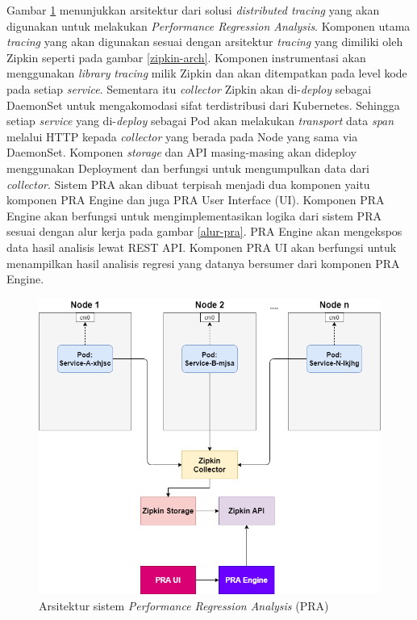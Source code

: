 Gambar \ref{arch-pra} menunjukkan arsitektur dari solusi \textit{distributed tracing} yang akan digunakan untuk melakukan \textit{Performance Regression Analysis}. Komponen utama \textit{tracing} yang akan digunakan sesuai dengan arsitektur \textit{tracing} yang dimiliki oleh Zipkin seperti pada gambar \ref{zipkin-arch}. Komponen instrumentasi akan menggunakan \textit{library} \textit{tracing} milik Zipkin dan akan ditempatkan pada level kode pada setiap \textit{service}. Sementara itu \textit{collector} Zipkin akan di-\textit{deploy} sebagai DaemonSet untuk mengakomodasi sifat terdistribusi dari Kubernetes. Sehingga setiap \textit{service} yang di-\textit{deploy} sebagai Pod akan melakukan \textit{transport} data \textit{span} melalui HTTP kepada \textit{collector} yang berada pada Node yang sama via DaemonSet. Komponen \textit{storage} dan API masing-masing akan dideploy menggunakan Deployment dan berfungsi untuk mengumpulkan data dari \textit{collector}. Sistem PRA akan dibuat terpisah menjadi dua komponen yaitu komponen PRA Engine dan juga PRA User Interface (UI). Komponen PRA Engine akan berfungsi untuk mengimplementasikan logika dari sistem PRA sesuai dengan alur kerja pada gambar \ref{alur-pra}. PRA Engine akan mengekspos data hasil analisis lewat REST API. Komponen PRA UI akan berfungsi untuk menampilkan hasil analisis regresi yang datanya bersumer dari komponen PRA Engine.
\begin{figure}[!htb]
	\centering
	\includegraphics[width=1\textwidth]{resources/ch3/arch.png}
	\caption{Arsitektur sistem \textit{Performance Regression Analysis} (PRA)}
	\label{arch-pra}
\end{figure}


